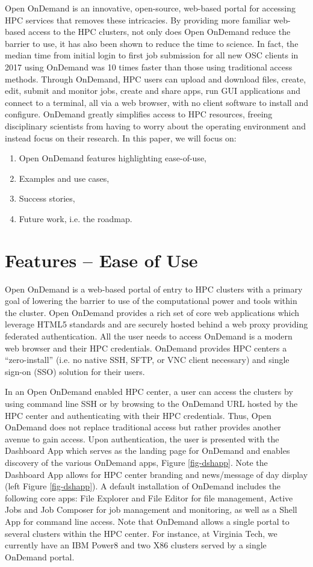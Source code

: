 \documentclass[runningheads]{llncs}
\begin{document}
Open OnDemand\cite{ref_article1} is an innovative, open-source, web-based portal for accessing HPC services that removes these intricacies.  By providing more familiar web-based access to the HPC clusters, not only does Open OnDemand reduce the barrier to use, it has also been shown to reduce the time to science.  In fact, the median time from initial login to first job submission for all new OSC clients in 2017 using OnDemand was 10 times faster than those using traditional access methods.  Through OnDemand, HPC users can upload and download files, create, edit, submit and monitor jobs, create and share apps, run GUI applications and connect to a terminal, all via a web browser, with no client software to install and configure. OnDemand greatly simplifies access to HPC resources, freeing disciplinary scientists from having to worry about the operating environment and instead focus on their research.  In this paper, we will focus on:
\begin{enumerate}
    \item Open OnDemand features highlighting ease-of-use,
    \item Examples and use cases,
    \item Success stories,
    \item Future work, i.e. the roadmap.
\end{enumerate}

\section{Features -- Ease of Use}

Open OnDemand is a web-based portal of entry to HPC clusters with a primary goal of lowering the barrier to use of the computational power and tools within the cluster.  Open OnDemand provides a rich set of core web applications which leverage HTML5 standards and are securely hosted behind a web proxy providing federated authentication. All the user needs to access OnDemand is a modern web browser and their HPC credentials. OnDemand provides HPC centers a “zero-install” (i.e. no native SSH, SFTP, or VNC client necessary) and single sign-on (SSO) solution for their users.  

In an Open OnDemand enabled HPC center, a user can access the clusters by using command line SSH or by browsing to the OnDemand URL hosted by the HPC center and authenticating with their HPC credentials. Thus, Open OnDemand does not replace traditional access but rather provides another avenue to gain access.  Upon authentication, the user is presented with the Dashboard App which serves as the landing page for OnDemand and enables discovery of the various OnDemand apps, Figure  \ref{fig-dshapp}.  Note the Dashboard App allows for HPC center branding and news/message of day display (left Figure \ref{fig-dshapp}).  A default installation of OnDemand includes the following core apps: File Explorer and File Editor for file management, Active Jobs and Job Composer for job management and monitoring, as well as a Shell App for command line access.  Note that OnDemand allows a single portal to several clusters within the HPC center.  For instance, at Virginia Tech, we currently have an IBM Power8 and two X86 clusters served by a single OnDemand portal.
\end{document}
